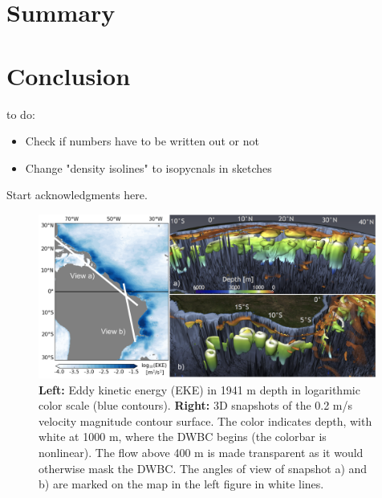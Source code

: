 \documentclass{ametsoc}
\begin{document}
\section{Summary}
\section{Conclusion}
to do:\\
\begin{itemize}
\item Check if numbers have to be written out or not
\item Change "density isolines" to isopycnals in sketches
\end{itemize}

\newpage
\acknowledgments
Start acknowledgments here.











\begin{figure}
\centering
\includegraphics[width=0.99\textwidth]{figs/3D_and_map_.pdf}
\caption{\textbf{Left:} Eddy kinetic energy (EKE) in 1941 m depth in logarithmic color scale (blue contours). \textbf{Right:} 3D snapshots of the 0.2 m/s velocity magnitude contour surface. The color indicates depth, with white at 1000 m, where the DWBC begins (the colorbar is nonlinear). The flow above 400 m is made transparent as it would otherwise mask the DWBC. The angles of view of snapshot a) and b) are marked on the map in the left figure in white lines. }
\label{fig:eke_3D}
\end{figure}
\end{document}
